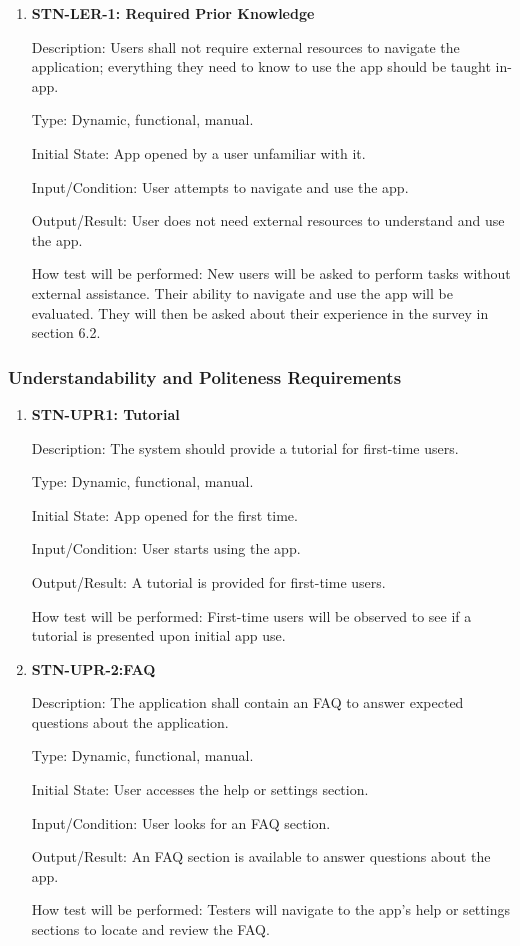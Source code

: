 \documentclass[12pt, titlepage]{article}
\begin{document}
    \begin{enumerate}

        \item {\textbf{STN-LER-1: Required Prior Knowledge}}

        Description: Users shall not require external resources to navigate the application; everything they need to know to use the app should be taught in-app.

        Type: Dynamic, functional, manual.

        Initial State: App opened by a user unfamiliar with it.

        Input/Condition: User attempts to navigate and use the app.

        Output/Result: User does not need external resources to understand and use the app.

        How test will be performed: New users will be asked to perform tasks without external assistance. Their ability to navigate and use the app will be evaluated. They will then be asked about their experience in the survey in section 6.2.

    \end{enumerate}

    \subsubsection{Understandability and Politeness Requirements}

    \begin{enumerate}

        \item {\textbf{STN-UPR1: Tutorial}}

        Description: The system should provide a tutorial for first-time users.

        Type: Dynamic, functional, manual.

        Initial State: App opened for the first time.

        Input/Condition: User starts using the app.

        Output/Result: A tutorial is provided for first-time users.

        How test will be performed: First-time users will be observed to see if a tutorial is presented upon initial app use.


        \item{\textbf{STN-UPR-2:FAQ}}

        Description: The application shall contain an FAQ to answer expected questions about the application.

        Type: Dynamic, functional, manual.

        Initial State: User accesses the help or settings section.

        Input/Condition: User looks for an FAQ section.

        Output/Result: An FAQ section is available to answer questions about the app.

        How test will be performed: Testers will navigate to the app's help or settings sections to locate and review the FAQ.

    \end{enumerate}
\end{document}
